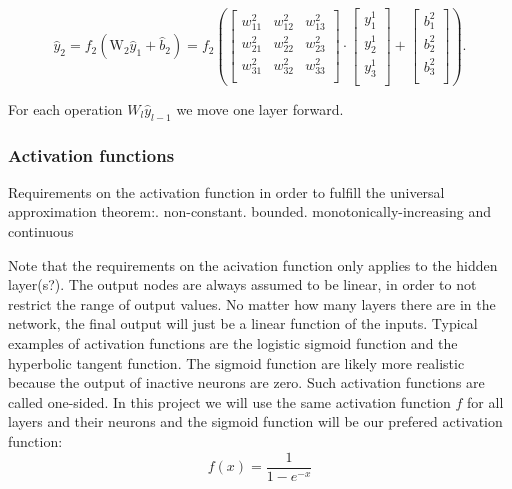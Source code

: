 \documentclass[a4paper,12pt]{article}
\begin{document}
\begin{equation}
 \hat{y}_2 = f_2(\mathrm{W}_2 \hat{y}_{1} + \hat{b}_{2}) = 
 f_2\left(\left[\begin{array}{ccc}
    w^2_{11} &w^2_{12} &w^2_{13} \\
    w^2_{21} &w^2_{22} &w^2_{23} \\
    w^2_{31} &w^2_{32} &w^2_{33} \\
    \end{array} \right] \cdot
    \left[\begin{array}{c}
           y^1_1 \\
           y^1_2 \\
           y^1_3 \\
          \end{array}\right] + 
    \left[\begin{array}{c}
           b^2_1 \\
           b^2_2 \\
           b^2_3 \\
          \end{array}\right]\right).
\end{equation}

For each operation $W_l \hat{y}_{l-1}$ we move one layer forward.\newline

\subsubsection{Activation functions}
Requirements on the activation function in order to fulfill the universal approximation theorem:. non-constant. bounded. monotonically-increasing and continuous\newline

Note that the requirements on the acivation function only applies to the hidden layer(s?). The output nodes are always assumed to be linear, in order to not restrict the range of output values. No matter how many layers there are in the network, the final output will just be a linear function of the inputs.\newline
Typical examples of activation functions are the logistic sigmoid function and the hyperbolic tangent function. The sigmoid function are likely more realistic because the output of inactive neurons are zero. Such activation functions are called one-sided. In this project we will use the same activation function $f$ for all layers and their neurons and the sigmoid function will be our prefered activation function: 
\begin{equation}
    f(x) = \frac{1}{ 1 - e^{-x} }
\end{equation}
\end{document}
